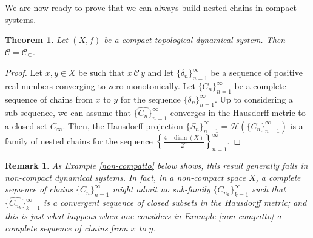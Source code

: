 \documentclass[10pt,a4paper]{article}
\theoremstyle{definition}
\theoremstyle{remark}
\theoremstyle{plain}
\newtheorem{thm}[defi]{Theorem}
\newtheorem{rem}[defi]{Remark}
\begin{document}
We are now ready to prove that we can always build nested chains in compact systems.

\begin{thm}\label{C=C_nested}
    Let $(X,f)$ be a compact topological dynamical system.
    Then $\mathcal{C}=\mathcal{C}_\subseteq$.
\end{thm}
\begin{proof}
    Let $x,y\in X$ be such that $x\,\mathcal{C}\, y$ and let $\{\delta_n\}_{n=1}^\infty$ be a sequence of positive real numbers converging to zero monotonically. Let $\{C_n\}_{n=1}^\infty$ be a complete sequence of chains from $x$ to $y$ for the sequence $\{\delta_n\}_{n=1}^\infty$. 
    Up to considering a sub-sequence, we can assume that $\{\widehat{C_n}\}_{n=1}^\infty$ converges in the Hausdorff metric to a closed set $C_\infty$. Then, the Hausdorff projection $\{S_n\}_{n=1}^\infty=\mathcal{H}(\{C_n\}_{n=1}^\infty)$ is a family of nested chains for the sequence $\left\{\frac{4\,\cdot\,\operatorname{diam}(X)}{2^n}\right\}_{n=1}^\infty$.
\end{proof}

\begin{rem}
    As Example \ref{non-compatto} below shows, this result generally fails in non-compact dynamical systems. In fact, in a non-compact space $X$, a complete sequence of chains $\{C_n\}_{n=1}^\infty$ might admit no  sub-family $\{C_{n_k}\}_{k=1}^\infty$ such that $\{\widehat{C_{n_k}}\}_{k=1}^\infty$ is a convergent sequence of closed subsets in the Hausdorff metric; and this is just what happens when one considers in Example \ref{non-compatto} a complete sequence of chains from $x$ to $y$. 
\end{rem}
\end{document}
